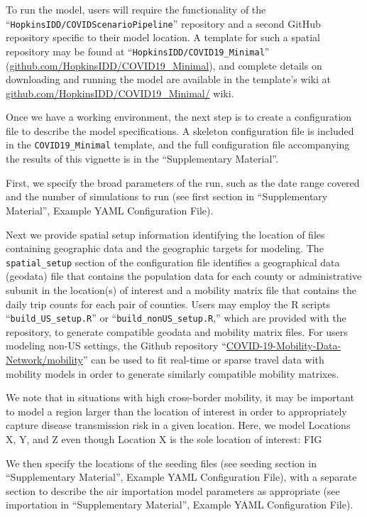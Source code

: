 To run the model, users will require the functionality of the “\verb|HopkinsIDD/COVIDScenarioPipeline|” repository and a second GitHub repository specific to their model location. A template for such a spatial repository may be found at “\verb|HopkinsIDD/COVID19_Minimal|” (\url{github.com/HopkinsIDD/COVID19_Minimal}), and complete details on downloading and running the model are available in the template’s wiki at \url{github.com/HopkinsIDD/COVID19_Minimal/} wiki.

Once we have a working environment, the next step is to create a configuration file to describe the model specifications. A skeleton configuration file is included in the \verb|COVID19_Minimal| template, and the full configuration file accompanying the results of this vignette is in the “Supplementary Material”.

First, we specify the broad parameters of the run, such as the date range covered and the number of simulations to run (see first section in “Supplementary Material”, Example YAML Configuration File).

Next we provide spatial setup information identifying the location of files containing geographic data and the geographic targets for modeling. The \verb|spatial_setup| section of the configuration file identifies a geographical data (geodata) file that contains the population data for each county or administrative subunit in the location(s) of interest and a mobility matrix file that contains the daily trip counts for each pair of counties. Users may employ the R scripts “\verb|build_US_setup.R|” or “\verb|build_nonUS_setup.R|,” which are provided with the repository, to generate compatible geodata and mobility matrix files. For users modeling non-US settings, the Github repository “\url{COVID-19-Mobility-Data-Network/mobility}” can be used to fit real-time or sparse travel data with mobility models in order to generate similarly compatible mobility matrixes\cite{Giles:COVID19MobilityDataNetworkMobilityV0:2020,Giles:MobilityPackageModeling}.

We note that in situations with high cross-border mobility, it may be important to model a region larger than the location of interest in order to appropriately capture disease transmission risk in a given location. Here, we model Locations X, Y, and Z even though Location X is the sole location of interest:
FIG

We then specify the locations of the seeding files (see seeding section in “Supplementary Material”, Example YAML Configuration File), with a separate section to describe the air importation model parameters as appropriate (see importation in “Supplementary Material”, Example YAML Configuration File).


